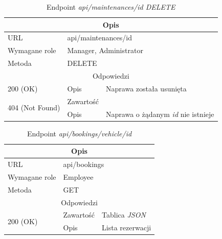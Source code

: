 \documentclass[eng,printmode,openany]{mgr}
\begin{document}
\begin{table}[H]
	\caption{Endpoint \textit{api/maintenances/id DELETE}}
	\begin{tabularx}{\textwidth}{|l|l|X|}
		\hline
		\multicolumn{3}{|c|}{Opis}
		\\ \hline
		URL                       & \multicolumn{2}{l|}{api/maintenances/id}
		\\ \hline
		Wymagane role             & \multicolumn{2}{l|}{Manager, Administrator}
		\\ \hline
		Metoda                    & \multicolumn{2}{l|}{DELETE}
		\\ \hline
		\multicolumn{3}{|c|}{Odpowiedzi}
		\\ \hline
		200 (OK)			                & Opis         	& Naprawa została usunięta
		\\ \hline
		\multirow{2}{*}{404 (Not Found)} 	& Zawartość     & 
		\\ \cline{2-3}                      & Opis          & Naprawa o żądanym \textit{id} nie istnieje
		\\ \hline
	\end{tabularx}
\end{table}

\begin{table}[H]
	\caption{Endpoint \textit{api/bookings/vehicle/id}}
	\begin{tabularx}{\textwidth}{|l|l|X|}
		\hline
		\multicolumn{3}{|c|}{Opis}
		\\ \hline
		URL                         & \multicolumn{2}{l|}{api/bookings}
		\\ \hline
		Wymagane role               & \multicolumn{2}{l|}{Employee}
		\\ \hline
		Metoda                      & \multicolumn{2}{l|}{GET}
		\\ \hline
		\multicolumn{3}{|c|}{ Odpowiedzi}
		\\ \hline
		\multirow{2}{*}{200 (OK)}   & Zawartość         & Tablica \textit{JSON}
		\\ \cline{2-3}              & Opis         	    & Lista rezerwacji
		\\ \hline
	\end{tabularx}
\end{table}
\end{document}
